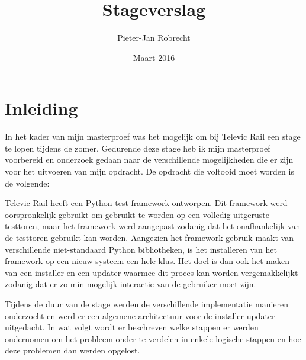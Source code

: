 \documentclass{article}
\title{Stageverslag}
\author{\mbox{Pieter-Jan} Robrecht}
\date{Maart 2016}
\begin{document}


\clearpage
\setcounter{page}{1}

\tableofcontents

\section{Inleiding}
In het kader van mijn masterproef was het mogelijk om bij Televic Rail een stage te lopen tijdens de zomer. 
Gedurende deze stage heb ik mijn masterproef voorbereid en onderzoek gedaan naar de verschillende mogelijkheden die er zijn voor het uitvoeren van mijn opdracht.
De opdracht die voltooid moet worden is de volgende:
\begin{displayquote}
Televic Rail heeft een Python test framework ontworpen. 
Dit framework werd oorspronkelijk gebruikt om gebruikt te worden op een volledig uitgeruste testtoren, maar het framework werd aangepast zodanig dat het onafhankelijk van de testtoren gebruikt kan worden.
Aangezien het framework gebruik maakt van verschillende niet-standaard Python bibliotheken, is het installeren van het framework op een nieuw systeem een hele klus.
Het doel is dan ook het maken van een installer en een updater waarmee dit proces kan worden vergemakkelijkt zodanig dat er zo min mogelijk interactie van de gebruiker moet zijn.
\end{displayquote}
Tijdens de duur van de stage werden de verschillende implementatie manieren onderzocht en werd er een algemene architectuur voor de installer-updater uitgedacht.
In wat volgt wordt er beschreven welke stappen er werden ondernomen om het probleem onder te verdelen in enkele logische stappen en hoe deze problemen dan werden opgelost. 
\end{document}
